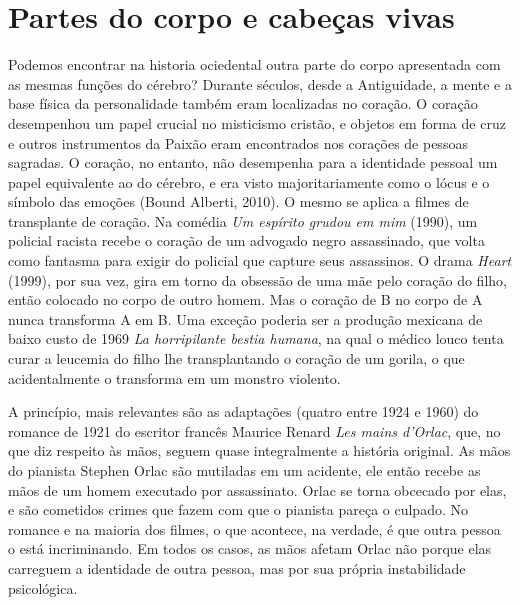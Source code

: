 \section{Partes do corpo e cabeças vivas}

Podemos encontrar na historia ociedental outra parte do corpo
apresentada com as mesmas funções do cérebro? Durante séculos, desde a
Antiguidade, a mente e a base física da personalidade também eram
localizadas no coração. O coração desempenhou um papel crucial no
misticismo cristão, e objetos em forma de cruz e outros instrumentos da
Paixão eram encontrados nos corações de pessoas sagradas. O coração, no
entanto, não desempenha para a identidade pessoal um papel equivalente
ao do cérebro, e era visto majoritariamente como o lócus e o símbolo das
emoções (Bound Alberti, 2010). O mesmo se aplica a filmes de transplante
de coração. Na comédia \emph{Um espírito grudou em mim} (1990), um
policial racista recebe o coração de um advogado negro assassinado, que
volta como fantasma para exigir do policial que capture seus
assassinos. O drama \emph{Heart} (1999), por sua vez, gira em torno da
obsessão de uma mãe pelo coração do filho, então colocado no corpo de
outro homem. Mas o coração de B no corpo de A nunca transforma A em B.
Uma exceção poderia ser a produção mexicana de baixo custo de 1969
\emph{La horripilante bestia humana}, na qual o médico louco tenta curar
a leucemia do filho lhe transplantando o coração de um gorila, o que
acidentalmente o transforma em um monstro violento.

A princípio, mais relevantes são as adaptações (quatro entre 1924 e
1960) do romance de 1921 do escritor francês Maurice Renard \emph{Les
mains d'Orlac}, que, no que diz respeito às mãos, seguem quase
integralmente a história original. As mãos do pianista Stephen Orlac são
mutiladas em um acidente, ele então recebe as mãos de um homem executado por
assassinato. Orlac se torna obcecado por elas, e são cometidos crimes
que fazem com que o pianista pareça o culpado. No romance e na maioria
dos filmes, o que acontece, na verdade, é que outra pessoa o está
incriminando. Em todos os casos, as mãos afetam Orlac não porque elas
carreguem a identidade de outra pessoa, mas por sua própria instabilidade
psicológica.

